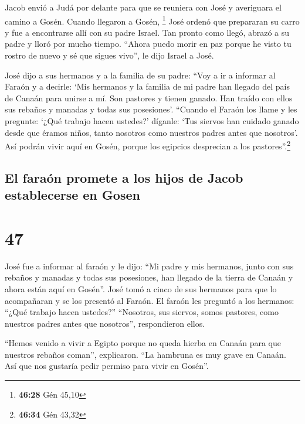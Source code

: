  Jacob envió a Judá por delante para que se reuniera con
José y averiguara el camino a Gosén. Cuando llegaron a Gosén,
\footnote{\textbf{46:28} Gén 45,10}  José ordenó que
prepararan su carro y fue a encontrarse allí con su padre Israel. Tan
pronto como llegó, abrazó a su padre y lloró por mucho tiempo.
 ``Ahora puedo morir en paz porque he visto tu rostro de
nuevo y sé que sigues vivo'', le dijo Israel a José.

 José dijo a sus hermanos y a la familia de su padre:
``Voy a ir a informar al Faraón y a decirle: `Mis hermanos y la familia
de mi padre han llegado del país de Canaán para unirse a mí.
 Son pastores y tienen ganado. Han traído con ellos sus
rebaños y manadas y todas sus posesiones'.  ``Cuando el
Faraón los llame y les pregunte: `¿Qué trabajo hacen ustedes?'
 díganle: `Tus siervos han cuidado ganado desde que
éramos niños, tanto nosotros como nuestros padres antes que nosotros'.
Así podrán vivir aquí en Gosén, porque los egipcios desprecian a los
pastores''.\footnote{\textbf{46:34} Gén 43,32}

\hypertarget{el-farauxf3n-promete-a-los-hijos-de-jacob-establecerse-en-gosen}{%
\subsection{El faraón promete a los hijos de Jacob establecerse en
Gosen}\label{el-farauxf3n-promete-a-los-hijos-de-jacob-establecerse-en-gosen}}

\hypertarget{section-46}{%
\section{47}\label{section-46}}

 José fue a informar al faraón y le dijo: ``Mi padre y mis
hermanos, junto con sus rebaños y manadas y todas sus posesiones, han
llegado de la tierra de Canaán y ahora están aquí en Gosén''.
 José tomó a cinco de sus hermanos para que lo acompañaran
y se los presentó al Faraón.  El faraón les preguntó a los
hermanos: ``¿Qué trabajo hacen ustedes?'' ``Nosotros, sus siervos, somos
pastores, como nuestros padres antes que nosotros'', respondieron ellos.

 ``Hemos venido a vivir a Egipto porque no queda hierba en
Canaán para que nuestros rebaños coman'', explicaron. ``La hambruna es
muy grave en Canaán. Así que nos gustaría pedir permiso para vivir en
Gosén''.

